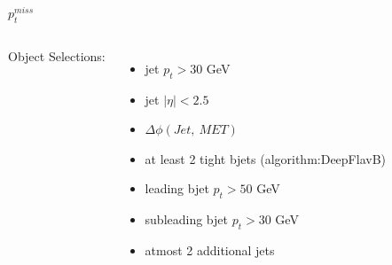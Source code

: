\documentclass[10pt,xcolor=dvipsnames,aspectratio=169]{beamer}
\begin{document}
\begin{frame}[fragile]{$p^{miss}_t$ }
\begin{columns}
    Object Selections:
    \begin{itemize}
      \raggedright 
      \tiny
      \item {jet $p_t > 30 $ GeV}
      \item {jet $| \eta | < 2.5 $}
      \item {$\Delta \phi (Jet, \ MET)$}
      \item {at least 2 tight bjets (algorithm:DeepFlavB)}
      \item {leading bjet $p_t > 50 $ GeV}
      \item {subleading bjet $p_t > 30 $ GeV}
      \item {atmost 2 additional jets}
    \end{itemize}
  \end{columns}
\end{frame}

\end{document}

